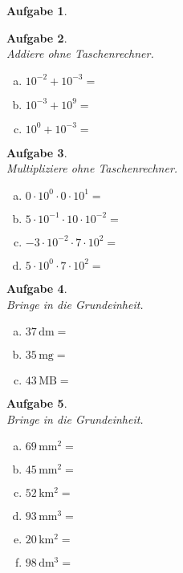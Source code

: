 \documentclass[12pt,fleqn]{article}
\theoremstyle{aufg}
\newtheorem{aufgabe}{Aufgabe}
\theoremstyle{bsp}
\begin{document}
\begin{flushleft}
\begin{aufgabe}
\begin{multicols}{3}
\end{multicols} 
\end{aufgabe} 
\begin{aufgabe} ~ \\ 
Addiere ohne Taschenrechner. \\ 
\begin{multicols}{3} 
\begin{enumerate}[a)] 
\item 
$10^{-2}+10^{-3}=$
\item 
$10^{-3}+10^{9}=$
\item 
$10^{0}+10^{-3}=$
\end{enumerate} 
\end{multicols} 
\end{aufgabe} 
\begin{aufgabe} ~ \\ 
Multipliziere ohne Taschenrechner. \\ 
\begin{multicols}{2} 
\begin{enumerate}[a)] 
\item 
$0\cdot10^{0}\cdot0\cdot10^{1}=$
\item 
$5\cdot10^{-1}\cdot10\cdot10^{-2}=$
\item 
$-3\cdot10^{-2}\cdot7\cdot10^{2}=$
\item 
$5\cdot10^{0}\cdot7\cdot10^{2}=$
\end{enumerate} 
\end{multicols} 
\end{aufgabe} 
\begin{aufgabe} ~ \\ 
Bringe in die Grundeinheit. \\ 
\begin{multicols}{3} 
\begin{enumerate}[a)] 
\item 
$37\,\mathrm{dm}=$
\item 
$35\,\mathrm{mg}=$
\item 
$43\,\mathrm{MB}=$
\end{enumerate} 
\end{multicols} 
\end{aufgabe} 
\begin{aufgabe} ~ \\ 
Bringe in die Grundeinheit. \\ 
\begin{multicols}{3} 
\begin{enumerate}[a)] 
\item 
$69\,\mathrm{mm^2}=$
\item 
$45\,\mathrm{mm^2}=$
\item 
$52\,\mathrm{km^2}=$
\item 
$93\,\mathrm{mm^3}=$
\item 
$20\,\mathrm{km^2}=$
\item 
$98\,\mathrm{dm^3}=$
\end{enumerate} 
\end{multicols} 
\end{aufgabe} 
\end{flushleft} 
\end{document}
